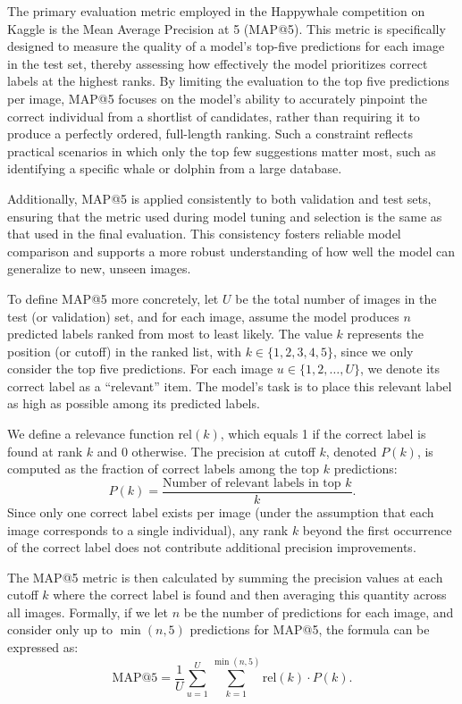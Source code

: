 \documentclass[twocolumn]{article}
\begin{document}
The primary evaluation metric employed in the Happywhale competition on Kaggle is the Mean Average Precision at 5 (MAP@5). This metric is specifically designed to measure the quality of a model’s top-five predictions for each image in the test set, thereby assessing how effectively the model prioritizes correct labels at the highest ranks. By limiting the evaluation to the top five predictions per image, MAP@5 focuses on the model’s ability to accurately pinpoint the correct individual from a shortlist of candidates, rather than requiring it to produce a perfectly ordered, full-length ranking. Such a constraint reflects practical scenarios in which only the top few suggestions matter most, such as identifying a specific whale or dolphin from a large database. 

Additionally, MAP@5 is applied consistently to both validation and test sets, ensuring that the metric used during model tuning and selection is the same as that used in the final evaluation. This consistency fosters reliable model comparison and supports a more robust understanding of how well the model can generalize to new, unseen images.

To define MAP@5 more concretely, let \( U \) be the total number of images in the test (or validation) set, and for each image, assume the model produces \( n \) predicted labels ranked from most to least likely. The value \( k \) represents the position (or cutoff) in the ranked list, with \( k \in \{1, 2, 3, 4, 5\} \), since we only consider the top five predictions. For each image \( u \in \{1, 2, \ldots, U\} \), we denote its correct label as a “relevant” item. The model’s task is to place this relevant label as high as possible among its predicted labels. 

We define a relevance function \( \text{rel}(k) \), which equals 1 if the correct label is found at rank \( k \) and 0 otherwise. The precision at cutoff \( k \), denoted \( P(k) \), is computed as the fraction of correct labels among the top \( k \) predictions:
\[
P(k) = \frac{\text{Number of relevant labels in top } k}{k}.
\]
Since only one correct label exists per image (under the assumption that each image corresponds to a single individual), any rank \( k \) beyond the first occurrence of the correct label does not contribute additional precision improvements.

The MAP@5 metric is then calculated by summing the precision values at each cutoff \( k \) where the correct label is found and then averaging this quantity across all images. Formally, if we let \( n \) be the number of predictions for each image, and consider only up to \( \min(n, 5) \) predictions for MAP@5, the formula can be expressed as:
\[
\text{MAP@5} = \frac{1}{U} \sum_{u=1}^{U} \sum_{k=1}^{\min(n, 5)} \text{rel}(k) \cdot P(k).
\]
\end{document}
